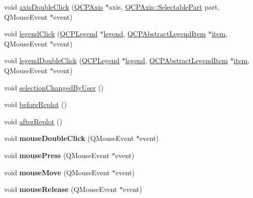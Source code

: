 \begin{DoxyCompactItemize}
\item 
void \hyperlink{class_q_custom_plot_a6df35357460181a72da3e93d600f5256}{axis\+Double\+Click} (\hyperlink{class_q_c_p_axis}{Q\+C\+P\+Axis} $\ast$axis, \hyperlink{class_q_c_p_axis_abee4c7a54c468b1385dfce2c898b115f}{Q\+C\+P\+Axis\+::\+Selectable\+Part} part, Q\+Mouse\+Event $\ast$event)
\item 
void \hyperlink{class_q_custom_plot_a79cff0baafbca10a3aaf694d2d3b9ab3}{legend\+Click} (\hyperlink{class_q_c_p_legend}{Q\+C\+P\+Legend} $\ast$\hyperlink{class_q_custom_plot_a4eadcd237dc6a09938b68b16877fa6af}{legend}, \hyperlink{class_q_c_p_abstract_legend_item}{Q\+C\+P\+Abstract\+Legend\+Item} $\ast$\hyperlink{class_q_custom_plot_ac042f2e78edd228ccf2f26b7fe215239}{item}, Q\+Mouse\+Event $\ast$event)
\item 
void \hyperlink{class_q_custom_plot_a0250f835c044521df1619b132288bca7}{legend\+Double\+Click} (\hyperlink{class_q_c_p_legend}{Q\+C\+P\+Legend} $\ast$\hyperlink{class_q_custom_plot_a4eadcd237dc6a09938b68b16877fa6af}{legend}, \hyperlink{class_q_c_p_abstract_legend_item}{Q\+C\+P\+Abstract\+Legend\+Item} $\ast$\hyperlink{class_q_custom_plot_ac042f2e78edd228ccf2f26b7fe215239}{item}, Q\+Mouse\+Event $\ast$event)
\item 
void \hyperlink{class_q_custom_plot_a500c64a109bc773c973ad274f2fa4190}{selection\+Changed\+By\+User} ()
\item 
void \hyperlink{class_q_custom_plot_a0cd30e29b73efd6afe096e44bc5956f5}{before\+Replot} ()
\item 
void \hyperlink{class_q_custom_plot_a6f4fa624af060bc5919c5f266cf426a0}{after\+Replot} ()
\item 
\mbox{\label{class_q_custom_plot_a9b232142c64fcf273a953ee08e5b90e9}} 
void {\bfseries mouse\+Double\+Click} (Q\+Mouse\+Event $\ast$event)
\item 
\mbox{\label{class_q_custom_plot_aca75bf9afb5dd19349c375de2a87a051}} 
void {\bfseries mouse\+Press} (Q\+Mouse\+Event $\ast$event)
\item 
\mbox{\label{class_q_custom_plot_a742ca4f94688bed2a685fd8a56ce5704}} 
void {\bfseries mouse\+Move} (Q\+Mouse\+Event $\ast$event)
\item 
\mbox{\label{class_q_custom_plot_ac8dc0ee6bb98e923c00b4ebafbe6134d}} 
void {\bfseries mouse\+Release} (Q\+Mouse\+Event $\ast$event)

\end{DoxyCompactItemize}
